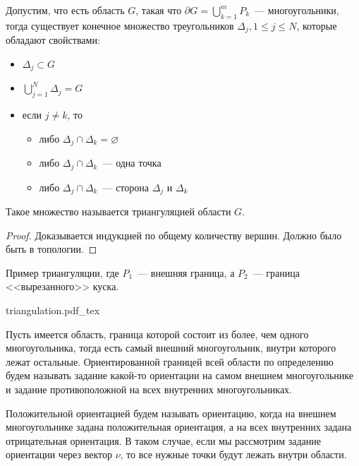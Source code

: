 \documentclass[main]{subfiles}
\begin{document}
\begin{theorem}[О триангуляции]
    Допустим, что есть область $G$, такая что $\partial G = \bigcup_{k=1}^m P_k$~--- многоугольники, тогда существует конечное множество треугольников $\Delta_j, 1 \le j \le N$, которые обладают свойствами:
    \begin{itemize}
        \item $\Delta_j \subset G$
        \item $\bigcup_{j=1}^N \Delta_j = G$
        \item если $j \neq k$, то
              \begin{itemize}
                  \item либо $\Delta_j \cap \Delta_k = \varnothing$
                  \item либо $\Delta_j \cap \Delta_k$~--- одна точка
                  \item либо $\Delta_j \cap \Delta_k$~--- сторона $\Delta_j$ и $\Delta_k$
              \end{itemize}
    \end{itemize}
    Такое множество называется триангуляцией области $G$.
\end{theorem}
\begin{proof}
    Доказывается индукцией по общему количеству вершин.
    Должно было быть в топологии.
\end{proof}
\begin{example}
    Пример триангуляции, где $P_1$~--- внешняя граница, а $P_2$~--- граница <<вырезанного>> куска.
    \begin{center}
        \def\svgwidth{0.4\linewidth}
        {triangulation.pdf_tex}
    \end{center}
\end{example}
\begin{definition}
    Пусть имеется область, граница которой состоит из более, чем одного многоугольника, тогда есть самый внешний многоугольник, внутри которого лежат остальные.
    Ориентированной границей всей области по определению будем называть задание какой-то ориентации на самом внешнем многоугольнике и задание противоположной на всех внутренних многоугольниках.

    Положительной ориентацией будем называть ориентацию, когда на внешнем многоугольнике задана положительная ориентация, а на всех внутренних задана отрицательная ориентация. В таком случае, если мы рассмотрим задание ориентации через вектор $\nu$, то все нужные точки будут лежать внутри области.
\end{definition}
\end{document}
